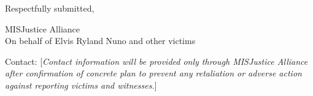 \documentclass[12pt,oneside]{article}
\begin{document}
\begin{flushleft}
\noindent
Respectfully submitted,

\vspace{0.3in}

\noindent
MISJustice Alliance \\
On behalf of Elvis Ryland Nuno and other victims

\vspace{0.2in}

\noindent
Contact: [\textit{Contact information will be provided only through MISJustice Alliance after confirmation of concrete plan to prevent any retaliation or adverse action against reporting victims and witnesses.}]

\end{flushleft}
\end{document}
